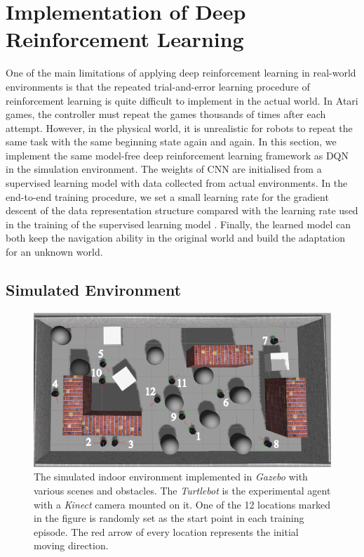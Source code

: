 \section{Implementation of Deep Reinforcement Learning}
\label{sec:ob_drl}
One of the main limitations of applying deep reinforcement learning in real-world environments is that the repeated trial-and-error learning procedure of reinforcement learning is quite difficult to implement in the actual world. In Atari games, the controller must repeat the games thousands of times after each attempt. However, in the physical world, it is unrealistic for robots to repeat the same task with the same beginning state again and again. In this section, we implement the same model-free deep reinforcement learning framework as DQN \cite{mnih2015human} in the simulation environment. The weights of CNN are initialised from a supervised learning model with data collected from actual environments. In the end-to-end training procedure, we set a small learning rate for the gradient descent of the data representation structure compared with the learning rate used in the training of the supervised learning model \cite{tai2016deep}. Finally, the learned model can both keep the navigation ability in the original world and build the adaptation for an unknown world.

\subsection{Simulated Environment}
\label{sec:ob_simuenvi}
\begin{figure}[!t]
    \centering
   \includegraphics[width=0.8\columnwidth]{figure/obstacle_figs/start_env_number}
    \caption{The simulated indoor environment implemented in \textit{Gazebo} with various scenes and obstacles. The \textit{Turtlebot} is the experimental agent with a \textit{Kinect} camera mounted on it. One of the 12 locations marked in the figure is randomly set as the start point in each  training episode. The red arrow of every location represents the initial moving direction.}
   \label{fig:ob_environment_figure}
\end{figure}


